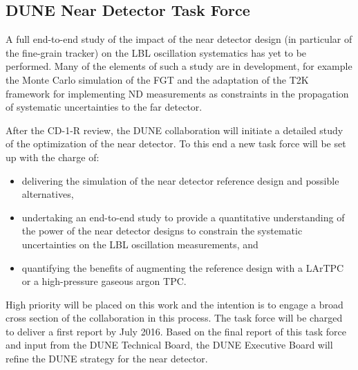 \subsection{DUNE Near Detector Task Force}

A full end-to-end study of the impact of the near detector design (in particular of the fine-grain tracker) on the LBL oscillation 
systematics has yet to be performed. Many of the elements of such a study are in 
development, for example the Monte Carlo simulation of the FGT and the adaptation 
of the T2K framework for implementing ND measurements as constraints in the propagation 
of systematic uncertainties to the far detector. 

After the CD-1-R review, the DUNE collaboration will initiate a detailed study 
of the optimization of the near detector. To this end a new task force will be set 
up with the charge of:

\begin{itemize}
\item delivering the simulation of the near detector reference design and possible alternatives,

\item undertaking an end-to-end study to provide a quantitative understanding of 
the power of the near detector designs to constrain the systematic uncertainties on the LBL 
oscillation measurements, and

\item quantifying the benefits of augmenting the reference design with a LArTPC 
or a high-pressure gaseous argon TPC.
\end{itemize}

High priority will be placed on this work and the intention is to engage a broad 
cross section of the collaboration in this process. The task force will be charged 
to deliver a first report by July 2016. Based on the final report of this task force and input 
from the DUNE Technical Board, the DUNE Executive Board will refine the DUNE strategy 
for the near detector.


